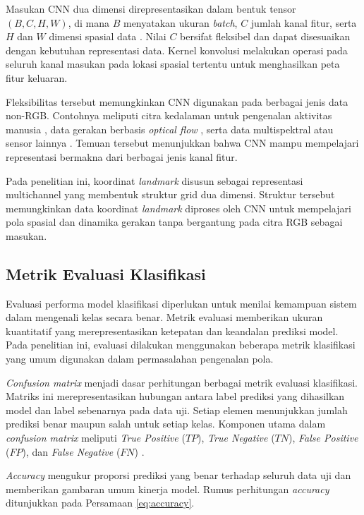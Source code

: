 Masukan CNN dua dimensi direpresentasikan dalam bentuk tensor $(B, C, H, W)$, di mana $B$ menyatakan ukuran \textit{batch}, $C$ jumlah kanal fitur, serta $H$ dan $W$ dimensi spasial data \cite{wu2017introductiontc}. 
Nilai $C$ bersifat fleksibel dan dapat disesuaikan dengan kebutuhan representasi data. 
Kernel konvolusi melakukan operasi pada seluruh kanal masukan pada lokasi spasial tertentu untuk menghasilkan peta fitur keluaran.

Fleksibilitas tersebut memungkinkan CNN digunakan pada berbagai jenis data non-RGB. 
Contohnya meliputi citra kedalaman untuk pengenalan aktivitas manusia \cite{shotton2011realtime}, data gerakan berbasis \textit{optical flow} \cite{simonyan2014twostream}, serta data multispektral atau sensor lainnya \cite{goodfellow2016deeplearning}. 
Temuan tersebut menunjukkan bahwa CNN mampu mempelajari representasi bermakna dari berbagai jenis kanal fitur.

Pada penelitian ini, koordinat \textit{landmark} disusun sebagai representasi multichannel yang membentuk struktur grid dua dimensi. 
Struktur tersebut memungkinkan data koordinat \textit{landmark} diproses oleh CNN untuk mempelajari pola spasial dan dinamika gerakan tanpa bergantung pada citra RGB sebagai masukan.

\subsection{Metrik Evaluasi Klasifikasi}
\label{subsec:metrik-evaluasi}

Evaluasi performa model klasifikasi diperlukan untuk menilai kemampuan sistem dalam mengenali kelas secara benar. 
Metrik evaluasi memberikan ukuran kuantitatif yang merepresentasikan ketepatan dan keandalan prediksi model. 
Pada penelitian ini, evaluasi dilakukan menggunakan beberapa metrik klasifikasi yang umum digunakan dalam permasalahan pengenalan pola.

\textit{Confusion matrix} menjadi dasar perhitungan berbagai metrik evaluasi klasifikasi. 
Matriks ini merepresentasikan hubungan antara label prediksi yang dihasilkan model dan label sebenarnya pada data uji. 
Setiap elemen menunjukkan jumlah prediksi benar maupun salah untuk setiap kelas. 
Komponen utama dalam \textit{confusion matrix} meliputi \textit{True Positive} ($TP$), \textit{True Negative} ($TN$), \textit{False Positive} ($FP$), dan \textit{False Negative} ($FN$) \cite{powers2020evaluation}.

\textit{Accuracy} mengukur proporsi prediksi yang benar terhadap seluruh data uji dan memberikan gambaran umum kinerja model. 
Rumus perhitungan \textit{accuracy} ditunjukkan pada Persamaan \ref{eq:accuracy}.


